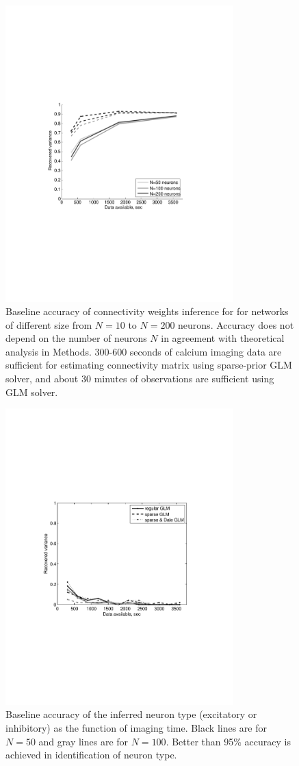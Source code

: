 \begin{figure}
\includegraphics[width=250pt]{../figs/Figure6c_perf_vs_N}
\caption{Baseline accuracy of connectivity weights inference for
for networks of different size from $N=10$ to $N=200$ neurons.
Accuracy does not depend on the number of neurons $N$ in agreement with theoretical analysis in Methods. 300-600 seconds of calcium imaging data are sufficient for estimating connectivity matrix using sparse-prior GLM solver, and about 30 minutes of observations are sufficient using GLM solver.}
\label{fig:data-n}
\end{figure}

\begin{figure}
\includegraphics[width=250pt]{../figs/Figure11_inhexc_errors}
\caption{Baseline accuracy of the inferred neuron type (excitatory or inhibitory) as the function of imaging time. Black lines are for $N=50$ and gray lines are for $N=100$. Better than 95\% accuracy
is achieved in identification of neuron type.}
\label{fig:data-ie}
\end{figure}

